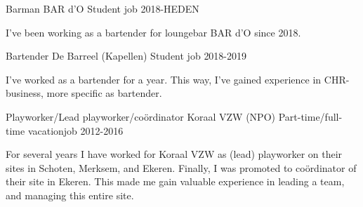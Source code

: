
    \begin{cventries}
    
        
        \cventry
        {Barman} %
        {BAR d'O} %
        {Student job} %
        {2018-HEDEN} %
        {
          \begin{cvitems} %
            \item {I've been working as a bartender for loungebar BAR d'O since 2018. }
          \end{cvitems}
        }
           
        \cventry
        {Bartender} %
        {De Barreel (Kapellen)} %
        {Student job} %
        {2018-2019} %
        {
          \begin{cvitems} %
                  \item {I've worked as a bartender for a year. This way, I've gained experience in CHR-business, more specific as bartender.}
          \end{cvitems}
        }
        
        \cventry
        {Playworker/Lead playworker/coördinator} %
        {Koraal VZW (NPO)} %
        {Part-time/full-time vacationjob} %
        {2012-2016} %
        {
          \begin{cvitems} %
                  \item {For several years I have worked for Koraal VZW as (lead) playworker on their sites in Schoten, Merksem, and Ekeren. Finally, I was promoted to coördinator of their site in Ekeren. This made me gain valuable experience in leading a team, and managing this entire site.}
          \end{cvitems}
        }
        
    \end{cventries}
